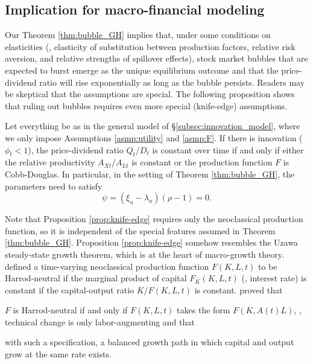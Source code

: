 \documentclass[a4paper,12pt]{article}
\numberwithin{equation}{section}
\theoremstyle{plain}
\begin{document}
\subsection{Implication for macro-financial modeling}\label{sec:uzawa}

Our Theorem \ref{thm:bubble_GH} implies that, under some conditions on elasticities (\eg, elasticity of substitution between production factors, relative risk aversion, and relative strengths of spillover effects), stock market bubbles that are expected to burst emerge as the unique equilibrium outcome and that the price-dividend ratio will rise exponentially as long as the bubble persists. Readers may be skeptical that the assumptions are special. The following proposition shows that ruling out bubbles requires even more special (knife-edge) assumptions.

\begin{prop}\label{prop:knife-edge}
Let everything be as in the general model of \S\ref{subsec:innovation_model}, where we only impose Assumptions \ref{asmp:utility} and \ref{asmp:F}. If there is innovation ($\phi_t<1$), the price-dividend ratio $Q_t/D_t$ is constant over time if and only if either the relative productivity $A_{Xt}/A_{Lt}$ is constant or the production function $F$ is Cobb-Douglas. In particular, in the setting of Theorem \ref{thm:bubble_GH}, the parameters need to satisfy
\begin{equation}
    \psi=(\xi_u-\lambda_u)(\rho-1)=0. \label{eq:knife-edge}
\end{equation}
\end{prop}

Note that Proposition \ref{prop:knife-edge} requires only the neoclassical production function, so it is independent of the special features assumed in Theorem \ref{thm:bubble_GH}. Proposition \ref{prop:knife-edge} somehow resembles the Uzawa steady-state growth theorem, which is at the heart of macro-growth theory. \citet[p.~118]{Uzawa1961} defined a time-varying neoclassical production function $F(K,L,t)$ to be Harrod-neutral if the marginal product of capital $F_K(K,L,t)$ (\ie, interest rate) is constant if the capital-output ratio $K/F(K,L,t)$ is constant. \citet{Uzawa1961} proved that 
\begin{enumerate*}
    \item $F$ is Harrod-neutral if and only if $F(K,L,t)$ takes the form $F(K,A(t)L)$, \ie, technical change is only labor-augmenting and that
    \item with such a specification, a balanced growth path in which capital and output grow at the same rate exists.
\end{enumerate*}
\end{document}
